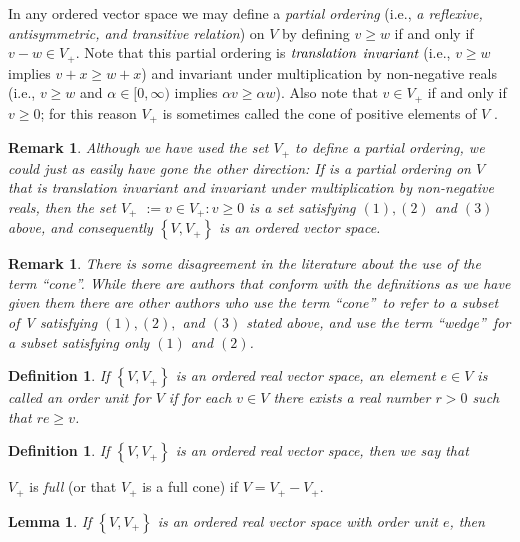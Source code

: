 \documentclass[aps,preprint]{revtex4}%
\newtheorem{definition}[theorem]{Definition}
\newtheorem{lemma}[theorem]{Lemma}
\newtheorem{remark}[theorem]{Remark}
\begin{document}
In any ordered vector space we may define a \emph{partial ordering} (i.e.,
\emph{a reflexive, antisymmetric, and transitive relation}) on $V$ by defining
$v\geq w$ if and only if $v-w\in V_{+}$. Note that this partial ordering is
$\emph{translation}$ $\emph{invariant}$ (i.e., $v\geq w$ implies $v+x\geq
w+x$) and invariant under multiplication by non-negative reals (i.e., $v\geq
w$ and $\alpha\in[0,\infty)$ implies $\alpha v\geq\alpha w$). Also note that
$v\in V_{+}$ if and only if $v\geq0$; for this reason $V_{+}$ is sometimes
called the cone of positive elements of $V$ .

\begin{remark}
Although we have used the set $V_{+}$ to define a partial ordering, we could
just as easily have gone the other direction: If is a partial ordering on $V$
that is translation invariant and invariant under multiplication by
non-negative reals, then the set $V_{+}$ $:=v\in V_{+}:v\geq0$ is a set
satisfying $(1),(2)$ and $(3)$ above, and consequently $\left\{
V,V_{+}\right\}  $ is an ordered vector space. 
\end{remark}

\begin{remark}
There is some disagreement in the literature about the use of the term
\textquotedblleft\emph{cone}\textquotedblright. While there are authors that
conform with the definitions as we have given them there are other authors who
use the term \textquotedblleft\emph{cone}\textquotedblright\ to refer to a
subset of V satisfying $(1),(2),$ and $(3)$ stated above, and use the term
\textquotedblleft\emph{wedge}\textquotedblright\ for a subset satisfying only
$(1)$ and $(2)$.
\end{remark}

\begin{definition}
If $\left\{  V,V_{+}\right\}  $ is an ordered real vector space, an element
$e\in V$ is called an \emph{order unit} for $V$ if for each $v\in V$ there
exists a real number $r>0$ such that $re\geq v$.
\end{definition}

\begin{definition}
If $\left\{  V,V_{+}\right\}  $ is an ordered real vector space, then we say that
\end{definition}

$V_{+}$ is \emph{full} (or that $V_{+}$ is a full cone) if $V=V_{+}-V_{+}$.

\begin{lemma}
If $\left\{  V,V_{+}\right\}  $ is an ordered real vector space with order
unit $e$, then
\end{lemma}
\end{document}
